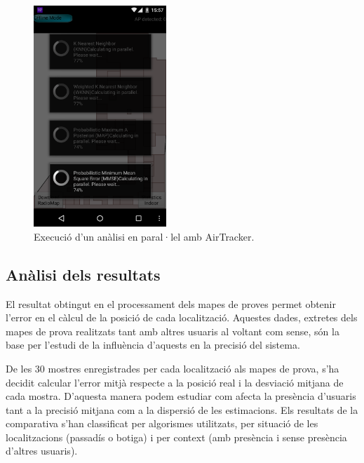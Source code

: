 \begin{figure}[ht]
\begin{center}
\includegraphics[width=5cm]{imatges/analisi_offline_paralel.png}
\caption{Execució d'un anàlisi en paral·lel amb AirTracker.}
\label{fig:analisi_offline_paralel}
\end{center}
\end{figure}

\subsection{Anàlisi dels resultats}

El resultat obtingut en el processament dels mapes de proves permet obtenir l'error en el càlcul de la posició de cada localització. Aquestes dades, extretes dels mapes de prova realitzats  tant amb altres usuaris al voltant com sense, són la base per l'estudi de la influència d'aquests en la precisió del sistema.

De les 30 mostres enregistrades per cada localització als mapes de prova, s'ha decidit calcular l'error mitjà respecte a la posició real i la desviació mitjana de cada mostra. D'aquesta manera podem estudiar com afecta la presència d'usuaris tant a la precisió mitjana com a la dispersió de les estimacions. Els resultats de la comparativa s'han classificat per algorismes utilitzats, per situació de les localitzacions (passadís o botiga) i per context (amb presència i sense presència d'altres usuaris).



